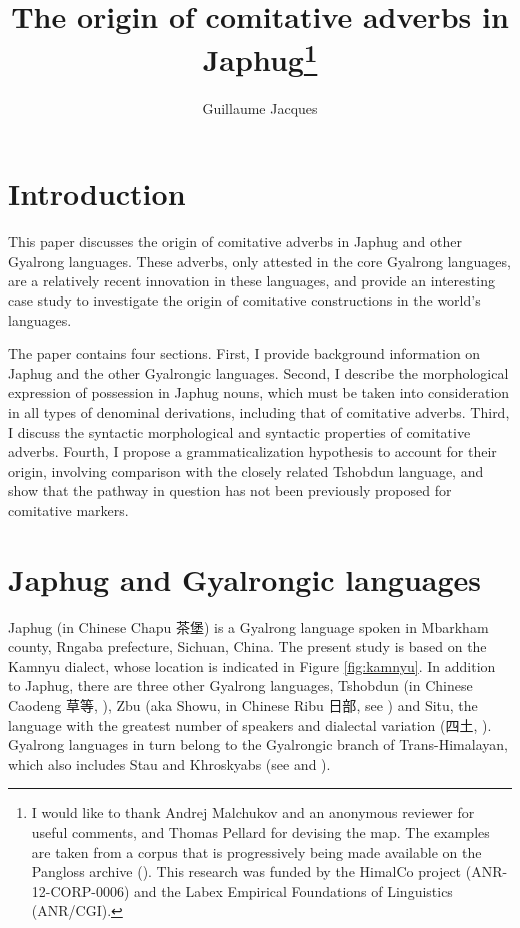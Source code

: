 \documentclass[oldfontcommands,oneside,a4paper,11pt]{article}
\newcommand{\zh}[1]{{\cn #1}}
\begin{document}
 
 \title{The origin of comitative adverbs in Japhug\footnote{I would like to thank Andrej Malchukov and an anonymous reviewer for useful comments, and Thomas Pellard for devising the map. The examples are taken from a corpus that is progressively being made available on the Pangloss archive (\citealt{michailovsky14pangloss}). This research was funded by the HimalCo project (ANR-12-CORP-0006) and  the Labex Empirical Foundations of Linguistics (ANR/CGI). }}
 \author{Guillaume Jacques }
 \maketitle 
 

\section*{Introduction}
This paper discusses the origin of comitative adverbs in Japhug and other Gyalrong languages. These adverbs, only attested in the core Gyalrong languages, are a relatively recent innovation in these languages, and provide an interesting case study to investigate the origin of comitative constructions in the world's languages.

The paper contains four sections.  First, I provide background information on Japhug and the other Gyalrongic languages. Second, I describe the morphological expression of possession in Japhug nouns, which must be taken into consideration in all types of denominal derivations, including that of comitative adverbs. Third, I discuss the syntactic morphological and syntactic properties of comitative adverbs. Fourth, I propose a grammaticalization hypothesis to account for their origin, involving comparison with the closely related Tshobdun language, and show that the pathway in question has not been previously proposed for comitative markers.

 \section{Japhug and Gyalrongic languages} 
Japhug (in Chinese Chapu \zh{茶堡}) is a Gyalrong language spoken in Mbarkham county, Rngaba prefecture, Sichuan, China. The present study is based on the Kamnyu dialect, whose location is indicated in Figure \ref{fig:kamnyu}. In addition to Japhug, there are three other Gyalrong languages, Tshobdun (in Chinese Caodeng \zh{草等}, \citealt{jackson03caodeng}), Zbu (aka Showu, in Chinese Ribu \zh{日部}, see \citealt{jackson04showu, gongxun14agreement}) and Situ, the language with the greatest number of speakers and dialectal variation (\zh{四土}, \citealt{linxr93jiarongen, huangsun02, prins11kyomkyo}). Gyalrong languages in turn belong to the Gyalrongic branch of Trans-Himalayan, which also includes Stau and Khroskyabs (see \citealt{jackson00puxi} and \citealt{lai15person}).
\end{document}
